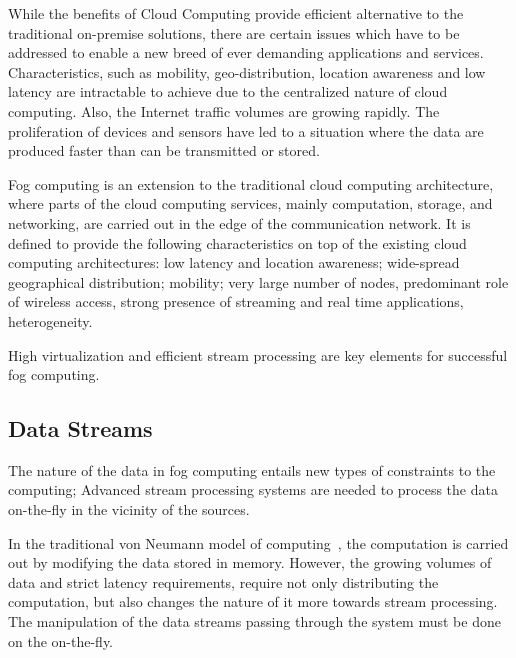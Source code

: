 
While the benefits of Cloud Computing provide efficient alternative to the traditional on-premise solutions, there are certain issues which have to be addressed to enable a new breed of ever demanding applications and services. Characteristics, such as mobility, geo-distribution, location awareness and low latency are intractable to achieve due to the centralized nature of cloud computing. Also, the Internet traffic volumes are growing rapidly. The proliferation of devices and sensors have led to a situation where the data are produced faster than can be transmitted or stored.~\cite{bonomi:2012:fog, vaquero:2014:FYW}

Fog computing is an extension to the traditional cloud computing architecture, where parts of the cloud computing services, mainly computation, storage, and networking, are carried out in the edge of the communication network. It is defined to provide the following characteristics on top of the existing cloud computing architectures: low latency and location awareness; wide-spread geographical distribution; mobility; very large number of nodes, predominant role of wireless access, strong presence of streaming and real time applications, heterogeneity.~\cite{bonomi:2012:fog}

High virtualization and efficient stream processing are key elements for successful fog computing.

\subsection{Data Streams}
The nature of the data in fog computing entails new types of constraints to the computing; Advanced stream processing systems are needed to process the data on-the-fly in the vicinity of the sources.~\cite{Bonomi:2012:Fog}

In the traditional von Neumann model of computing~\cite{Neumann:1993:EDVAC}, the computation is carried out by modifying the data stored in memory. However, the growing volumes of data and strict latency requirements, require not only distributing the computation, but also changes the nature of it more towards stream processing. The manipulation of the data streams passing through the system must be done on the on-the-fly.~\cite{Bonomi:2012:Fog, Thies:2002:StreamIt}

